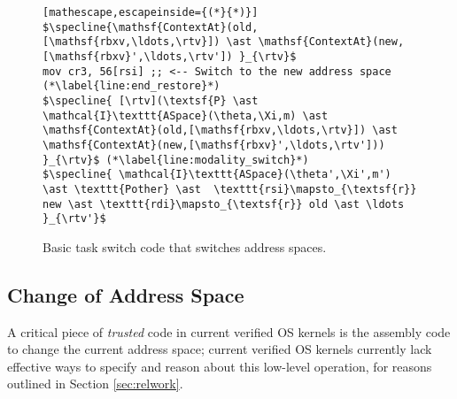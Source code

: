 \begin{figure}
\begin{lstlisting}[mathescape,escapeinside={(*}{*)}]
$\specline{\mathsf{ContextAt}(old,[\mathsf{rbxv,\ldots,\rtv}]) \ast \mathsf{ContextAt}(new,[\mathsf{rbxv}',\ldots,\rtv']) }_{\rtv}$
mov cr3, 56[rsi] ;; <-- Switch to the new address space (*\label{line:end_restore}*)
$\specline{ [\rtv](\textsf{P} \ast \mathcal{I}\texttt{ASpace}(\theta,\Xi,m) \ast \mathsf{ContextAt}(old,[\mathsf{rbxv,\ldots,\rtv}]) \ast \mathsf{ContextAt}(new,[\mathsf{rbxv}',\ldots,\rtv']))  }_{\rtv}$ (*\label{line:modality_switch}*)
$\specline{ \mathcal{I}\texttt{ASpace}(\theta',\Xi',m') \ast \texttt{Pother} \ast  \texttt{rsi}\mapsto_{\textsf{r}} new \ast \texttt{rdi}\mapsto_{\textsf{r}} old \ast \ldots }_{\rtv'}$
\end{lstlisting}
\vspace{-1em}
\caption{Basic task switch code that switches address spaces.}
\label{fig:swtch}
\end{figure}

\subsection{Change of Address Space}
A critical piece of \emph{trusted} code in current verified OS kernels is the assembly code to change the current address space; current verified OS kernels currently 
lack effective ways to specify and reason about this low-level operation, for reasons outlined in Section \ref{sec:relwork}.

